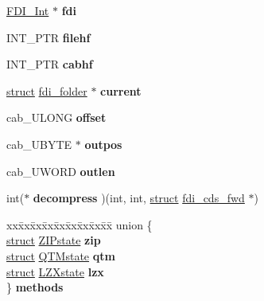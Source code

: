 \begin{DoxyCompactItemize}
\begin{tabbing}
\end{tabbing}\item 
\mbox{\label{structfdi__cds__fwd_ab3de1f374d0c07c664244e9528f2ef72}} 
\hyperlink{struct_f_d_i___int}{F\+D\+I\+\_\+\+Int} $\ast$ {\bfseries fdi}
\item 
\mbox{\label{structfdi__cds__fwd_a07e9a309691b67e77fb9828ae2a18a41}} 
I\+N\+T\+\_\+\+P\+TR {\bfseries filehf}
\item 
\mbox{\label{structfdi__cds__fwd_ad1664238522f283c809d823d83b8b9e0}} 
I\+N\+T\+\_\+\+P\+TR {\bfseries cabhf}
\item 
\mbox{\label{structfdi__cds__fwd_af8c5f95e78f7502124b128ad1cdcb568}} 
\hyperlink{interfacestruct}{struct} \hyperlink{structfdi__folder}{fdi\+\_\+folder} $\ast$ {\bfseries current}
\item 
\mbox{\label{structfdi__cds__fwd_ab8fc53b9e94230fb14bf9341b0aafd8d}} 
cab\+\_\+\+U\+L\+O\+NG {\bfseries offset}
\item 
\mbox{\label{structfdi__cds__fwd_af0c0cc194e481a178c5ca8bb4d08149b}} 
cab\+\_\+\+U\+B\+Y\+TE $\ast$ {\bfseries outpos}
\item 
\mbox{\label{structfdi__cds__fwd_a99388ebc4ff26931e7bc076d19a2de5c}} 
cab\+\_\+\+U\+W\+O\+RD {\bfseries outlen}
\item 
\mbox{\label{structfdi__cds__fwd_a118a2d98f61ead25eeda151615f59162}} 
int($\ast$ {\bfseries decompress} )(int, int, \hyperlink{interfacestruct}{struct} \hyperlink{structfdi__cds__fwd}{fdi\+\_\+cds\+\_\+fwd} $\ast$)
\item 
\mbox{\label{structfdi__cds__fwd_aea9633d409cfec16009cc4ea7ff658bd}} 
\begin{tabbing}
xx\=xx\=xx\=xx\=xx\=xx\=xx\=xx\=xx\=\kill
union \{\\
\>\hyperlink{interfacestruct}{struct} \hyperlink{struct_z_i_pstate}{ZIPstate} {\bfseries zip}\\
\>\hyperlink{interfacestruct}{struct} \hyperlink{struct_q_t_mstate}{QTMstate} {\bfseries qtm}\\
\>\hyperlink{interfacestruct}{struct} \hyperlink{struct_l_z_xstate}{LZXstate} {\bfseries lzx}\\
\} {\bfseries methods}\\


\end{tabbing}
\end{DoxyCompactItemize}
